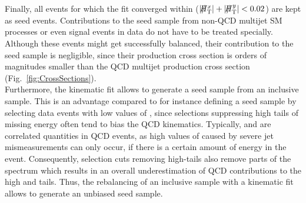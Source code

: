 Finally, all events for which the fit converged within ($|\slash\mkern-12mu{H}_{\text{T}}^x| + |\slash\mkern-12mu{H}_{\text{T}}^y| < 0.02$\gev) are kept as seed events. Contributions to the seed sample from non-QCD multijet SM processes or even signal events in data do not have to be treated specially. Although these events might get successfully balanced, their contribution to the seed sample is negligible, since their production cross section is orders of magnitudes smaller than the QCD multijet production cross section (\cf Fig.~\ref{fig:CrossSections}). \\
Furthermore, the kinematic fit allows to generate a seed sample from an inclusive sample. This is an advantage compared to for instance defining a seed sample by selecting data events with low values of \MHT, since selections suppressing high tails of missing energy often tend to bias the QCD kinematics. Typically, \HT and \MHT are correlated quantities in QCD events, as high values of \MHT caused by severe jet mismeasurements can only occur, if there is a certain amount of energy in the event. Consequently, selection cuts removing high-\MHT tails also remove parts of the \HT spectrum which results in an overall underestimation of QCD contributions to the high \HT and \MHT tails. Thus, the rebalancing of an inclusive sample with a kinematic fit allows to generate an unbiased seed sample.  

